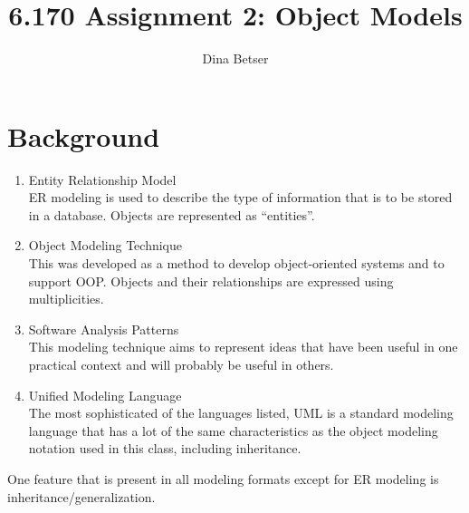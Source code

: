 \documentclass[11pt,letterpaper]{article}
\title{6.170 Assignment 2: Object Models}
\author{Dina Betser}
\begin{document}
\maketitle

\section{Background}
\begin{enumerate}
\item Entity Relationship Model\\
ER modeling is used to describe the type of information that is to be stored in a database. Objects are represented as ``entities''.
\item Object Modeling Technique\\
This was developed as a method to develop object-oriented systems and to support OOP. Objects and their relationships are expressed using multiplicities.
\item Software Analysis Patterns\\
This modeling technique aims to represent ideas that have been useful in one practical context and will probably be useful in others.
\item Unified Modeling Language\\
The most sophisticated of the languages listed, UML is a standard modeling language that has a lot of the same characteristics as the object modeling notation used in this class, including inheritance.
\end{enumerate}

One feature that is present in all modeling formats except for ER modeling is inheritance/generalization.
\end{document}
